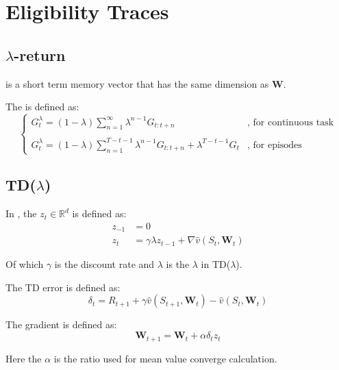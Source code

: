 \section{Eligibility Traces}

\subsection{$\lambda$-return}
 is a short term memory vector that has the same dimension as $\mathbf{W}$. 

The  is defined as:
\begin{equation}
	\begin{cases}
		G_t^\lambda = (1-\lambda)\sum\limits_{n=1}^\infty \lambda^{n-1} G_{t:t+n} & \text{, for continuous task}\\
		\\
		G_t^\lambda = (1-\lambda)\sum\limits_{n=1}^{T-t-1} \lambda^{n-1} G_{t:t+n} + \lambda^{T-t-1}G_t & \text{, for episodes} 
	\end{cases}
\end{equation}

\subsection{TD($\lambda$)}

In , the  $z_t \in \mathbb{R}^d$ is defined as:
\begin{equation}
	\begin{aligned}
		z_{-1} &= 0 \\
		z_t &= \gamma \lambda z_{t-1} + \nabla \widehat{v} (S_t, \mathbf{W}_t)
	\end{aligned}
\end{equation}

Of which $\gamma$ is the discount rate and $\lambda$ is the $\lambda$ in TD($\lambda$).

The TD error is defined as:
\begin{equation}
	\delta_t = R_{t+1} + \gamma \widehat{v}(S_{t+1}, \mathbf{W}_t) -\widehat{v}(S_t, \mathbf{W}_t) 
\end{equation}

The gradient is defined as:
\begin{equation}
	\mathbf{W}_{t+1} = \mathbf{W}_t + \alpha \delta_t z_t
\end{equation}

Here the $\alpha$ is the ratio used for mean value converge calculation. 

